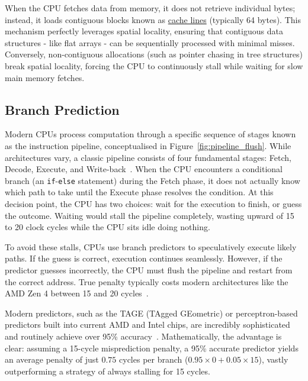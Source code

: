 When the CPU fetches data from memory, it does not retrieve individual bytes; 
instead, it loads contiguous blocks known as \hyperref[app:glossary]{cache lines} (typically 64 bytes). 
This mechanism perfectly leverages spatial locality, ensuring that contiguous 
data structures - like flat arrays - can be sequentially processed with minimal misses. 
Conversely, non-contiguous allocations (such as pointer chasing in tree structures) 
break spatial locality, forcing the CPU to continuously stall while waiting for 
slow main memory fetches.


\vspace{1em}
\subsection{Branch Prediction}
Modern CPUs process computation through a specific sequence of stages known as 
the instruction pipeline, conceptualised in Figure~\ref{fig:pipeline_flush}. 
While architectures vary, a classic pipeline consists of four fundamental stages: 
Fetch, Decode, Execute, and Write-back~\citep{patterson2013cod}. 
When the CPU encounters a conditional branch (an \texttt{if}-\texttt{else} statement) 
during the Fetch phase, it does not actually know which path to take until the 
Execute phase resolves the condition. 
At this decision point, the CPU has two choices: wait for the execution to finish, 
or guess the outcome. 
Waiting would stall the pipeline completely, wasting upward of 15 to 20 clock 
cycles while the CPU sits idle doing nothing. 

To avoid these stalls, CPUs use branch predictors to speculatively execute 
likely paths. 
If the guess is correct, execution continues seamlessly. 
However, if the predictor guesses incorrectly, the CPU must flush the 
pipeline and restart from the correct address. 
True penalty typically costs modern architectures like the AMD Zen 4 between 
15 and 20 cycles~\citep{fog_microarchitecture}. 

Modern predictors, such as the TAGE (TAgged GEometric) or perceptron-based 
predictors built into current AMD and Intel chips, are incredibly sophisticated 
and routinely achieve over 95\% accuracy~\citep{seznec2006case}. 
Mathematically, the advantage is clear: assuming a 15-cycle misprediction penalty, 
a 95\% accurate predictor yields an average penalty of just $0.75$ cycles per branch 
($0.95 \times 0 + 0.05 \times 15$), vastly outperforming a strategy of always 
stalling for 15 cycles. 


